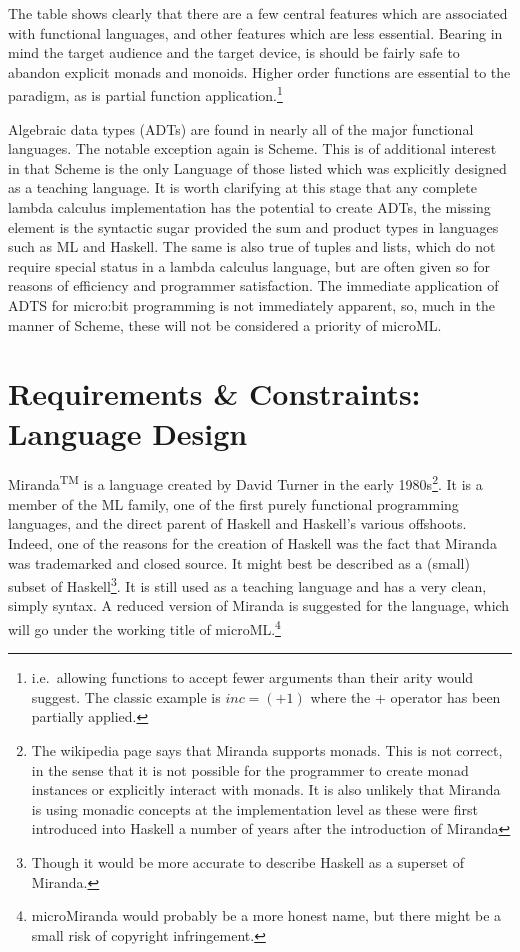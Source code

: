 \documentclass[12pt, a4paper]{report}
\begin{document}
The table shows clearly that there are a few central features which are associated with functional
languages, and other features which are less essential. Bearing in mind the target audience and the
target device, is should be fairly safe to abandon explicit monads and monoids. Higher order functions are
essential to the paradigm, as is partial function application.\footnote{i.e.\ allowing functions to
    accept fewer arguments than their arity would suggest. The classic example is $ inc = (+1) $ where
    the + operator has been partially applied.}

Algebraic data types (ADTs) are found in nearly all of the major functional languages. The notable
exception again is Scheme. This is of additional interest in that Scheme is the only Language of
those listed which was explicitly designed as a teaching language. It is worth clarifying at this
stage that any complete lambda calculus implementation has the potential to create ADTs, the missing
element is the syntactic sugar provided the sum and product types in languages such as ML and
Haskell. The same is also true of tuples and lists, which do not require special status in a
lambda calculus language, but are often given so for reasons of efficiency and programmer
satisfaction. The immediate application of ADTS for micro:bit programming is not immediately
apparent, so, much in the manner of Scheme, these will not be considered a priority of microML.

\section{Requirements \& Constraints: Language Design}
Miranda\textsuperscript{TM} is a language created by David Turner in the early 1980s\footnote{The wikipedia 
    page says that Miranda supports monads. This is not correct, in
    the sense that it is not possible for the programmer to create monad instances or explicitly
    interact with monads. It is also
unlikely that Miranda is using monadic concepts at the implementation level as these were first
introduced into Haskell a number of years after the introduction of Miranda}. It is a member
of the ML family, one of the first purely functional programming languages, and the direct parent of
Haskell and Haskell's various offshoots. Indeed, one of the reasons for the creation of Haskell was
the fact that Miranda was trademarked and closed source. It might best be described as a (small)
subset of Haskell\footnote{Though it would be more accurate to describe Haskell as a superset of
    Miranda.}. It is still used as a teaching language and has a very clean, simply syntax. A
reduced version of Miranda is suggested for the language, which will go under the working title of
microML.\footnote{microMiranda would probably be a more honest name, but there might be a small
    risk of copyright infringement.}
\end{document}
